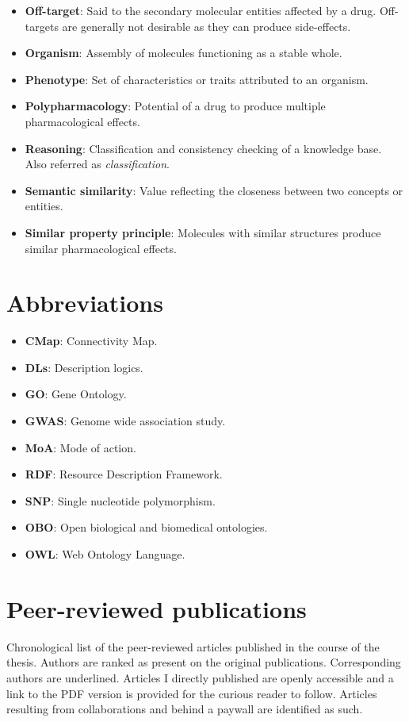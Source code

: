 \begin{itemize}
  \item \textbf{Off-target}: Said to the secondary molecular entities affected by a drug. Off-targets are generally not desirable as they can produce side-effects.
  \item \textbf{Organism}: Assembly of molecules functioning as a stable whole.
  \item \textbf{Phenotype}: Set of characteristics or traits attributed to an organism.
  \item \textbf{Polypharmacology}: Potential of a drug to produce multiple pharmacological effects.
  \item \textbf{Reasoning}: Classification and consistency checking of a knowledge base. Also referred as \emph{classification}.
  \item \textbf{Semantic similarity}: Value reflecting the closeness between two concepts or entities.
  \item \textbf{Similar property principle}: Molecules with similar structures produce similar pharmacological effects.
\end{itemize}

\chapter{Abbreviations}
\begin{itemize}
  \item \textbf{CMap}: Connectivity Map.
  \item \textbf{DLs}: Description logics.
  \item \textbf{GO}: Gene Ontology.
  \item \textbf{GWAS}: Genome wide association study.
  \item \textbf{MoA}: Mode of action.
  \item \textbf{RDF}: Resource Description Framework.
  \item \textbf{SNP}: Single nucleotide polymorphism.
  \item \textbf{OBO}: Open biological and biomedical ontologies.
  \item \textbf{OWL}: Web Ontology Language.
\end{itemize}

\chapter{Peer-reviewed publications}
Chronological list of the peer-reviewed articles published in the course of the thesis. Authors are ranked as present on the original publications. Corresponding authors are underlined. Articles I directly published are openly accessible and a link to the PDF version is provided for the curious reader to follow. Articles resulting from collaborations and behind a paywall are identified as such.

